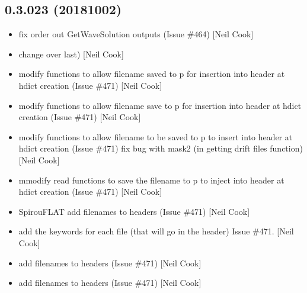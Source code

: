 \documentclass[a4paper,10pt,english]{report}
\begin{document}
\subsection{0.3.023 (2018\sphinxhyphen{}10\sphinxhyphen{}02)}
\label{\detokenize{misc/changelog:id327}}\begin{itemize}
\item {} 
 \sphinxhyphen{} fix order out GetWaveSolution outputs (Issue
\#464) {[}Neil Cook{]}

\item {} 
 \sphinxhyphen{} change over  last) {[}Neil Cook{]}

\item {} 
 \sphinxhyphen{} modify functions to allow filename saved to p \sphinxhyphen{}
for insertion into header at hdict creation (Issue  \#471) {[}Neil Cook{]}

\item {} 
 \sphinxhyphen{} modify functions to allow filename save to p \sphinxhyphen{} for
insertion into header at hdict creation (Issue  \#471) {[}Neil Cook{]}

\item {} 
 \sphinxhyphen{} modify functions to allow filename to be saved to p \sphinxhyphen{}
to insert into header at hdict creation (Issue  \#471) \sphinxhyphen{} fix bug with
mask2 (in getting drift files function) {[}Neil Cook{]}

\item {} 
 \sphinxhyphen{} mmodify read functions to save the filename to p \sphinxhyphen{} to
inject into header at hdict creation (Issue  \#471) {[}Neil Cook{]}

\item {} 
SpirouFLAT \sphinxhyphen{} add filenames to headers (Issue  \#471) {[}Neil Cook{]}

\item {} 
 \sphinxhyphen{} add the keywords for each file (that will go in
the header) \sphinxhyphen{} Issue  \#471. {[}Neil Cook{]}

\item {} 
 \sphinxhyphen{} add filenames to headers (Issue  \#471) {[}Neil Cook{]}

\item {} 
 \sphinxhyphen{} add filenames to headers (Issue  \#471)
{[}Neil Cook{]}


\end{itemize}
\end{document}

